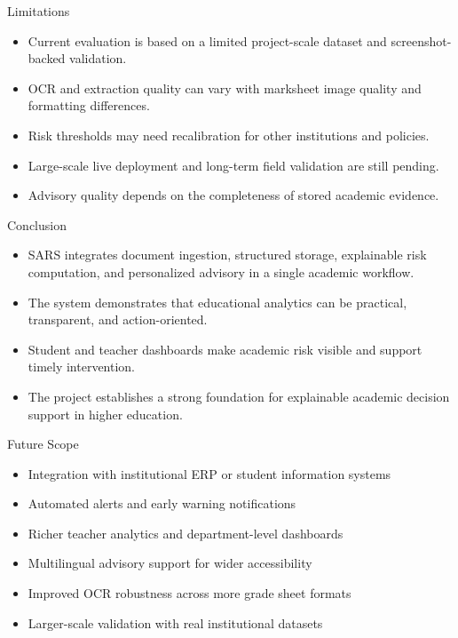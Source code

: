 \documentclass[aspectratio=169]{beamer}
\begin{document}
\begin{frame}{Limitations}
  \begin{itemize}
    \item Current evaluation is based on a limited project-scale dataset and screenshot-backed validation.
    \item OCR and extraction quality can vary with marksheet image quality and formatting differences.
    \item Risk thresholds may need recalibration for other institutions and policies.
    \item Large-scale live deployment and long-term field validation are still pending.
    \item Advisory quality depends on the completeness of stored academic evidence.
  \end{itemize}
\end{frame}

\begin{frame}{Conclusion}
  \begin{itemize}
    \item SARS integrates document ingestion, structured storage, explainable risk computation, and personalized advisory in a single academic workflow.
    \item The system demonstrates that educational analytics can be practical, transparent, and action-oriented.
    \item Student and teacher dashboards make academic risk visible and support timely intervention.
    \item The project establishes a strong foundation for explainable academic decision support in higher education.
  \end{itemize}
\end{frame}

\begin{frame}{Future Scope}
  \begin{itemize}
    \item Integration with institutional ERP or student information systems
    \item Automated alerts and early warning notifications
    \item Richer teacher analytics and department-level dashboards
    \item Multilingual advisory support for wider accessibility
    \item Improved OCR robustness across more grade sheet formats
    \item Larger-scale validation with real institutional datasets
  \end{itemize}
\end{frame}
\end{document}
